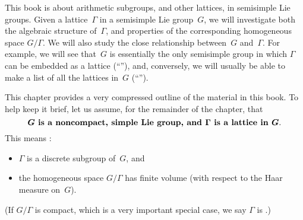 
\label{SummaryChap}

\makemarksfalse %


This book is about arithmetic subgroups, and other lattices, in semisimple Lie groups.
Given a lattice~$\Gamma$ in a semisimple Lie group~$G$, we will investigate both the algebraic structure of~$\Gamma$, and properties of the corresponding homogeneous space $G/\Gamma$. We will also study the close relationship between~$G$ and~$\Gamma$. For example, we will see that~$G$ is essentially the only semisimple group in which $\Gamma$ can be embedded as a lattice (``''), and, conversely, we will usually be able to make a list of all the lattices in~$G$ (``''). 



This chapter provides a very compressed outline of the material in this book. To help keep it brief, let us assume, for the remainder of the chapter, that
	$$ \text{\mathversion{bold}\bf$G$ is a noncompact, simple Lie group, and $\Gamma$ is a lattice in~$G$} .$$
This means :
	\begin{itemize}
	\item $\Gamma$ is a discrete subgroup of~$G$, 
	and 
	\item the homogeneous space $G/\Gamma$ has finite volume (with respect to the Haar measure on~$G$).
	\end{itemize} 
(If $G/\Gamma$ is compact, which is a very important special case, we say $\Gamma$ is .)



